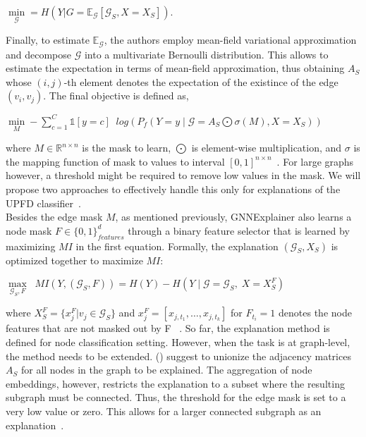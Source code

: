 \begin{center}
    $\min\limits_{\mathcal{G}} = H(Y | G = \mathbb{E}_{\mathcal{G}} [\mathcal{G}_S, X = X_S])$.
\end{center}
Finally, to estimate $\mathbb{E}_{\mathcal{G}}$, the authors employ mean-field variational approximation and decompose $\mathcal{G}$ into a multivariate Bernoulli distribution. This allows to estimate the expectation in terms of mean-field approximation, thus obtaining $A_S$ whose $(i, j)$-th element denotes the expectation of the existince of the edge $(v_i, v_j)$. The final objective is defined as,
\begin{center}
    $\min\limits_M - \sum\limits_{c=1}^C \mathbb{1}[y = c] \;\;log(P_f (Y=y \;|\; \mathcal{G} = A_S \bigodot \sigma(M), X = X_S))$
\end{center}
where $M \in \mathbb{R}^{n \times n}$ is the mask to learn, $\bigodot$ is element-wise multiplication, and $\sigma$ is
the mapping function of mask to values to interval $[0, 1]^{n \times n}$~\parencite{GNNExplainer_Ying}. For large graphs however, a threshold might be required to remove low values in the mask. We will propose two approaches to effectively
handle this only for explanations of the UPFD classifier~\parencite{GNNExplainer_Ying}.\\
Besides the edge mask $M$, as mentioned previously, GNNExplainer also learns a node mask $F \in \{0, 1\}^d_{features}$ through a binary feature selector that is learned by maximizing $MI$ in the first equation. Formally, the explanation $(\mathcal{G}_S, X_S)$ is optimized together to maximize $MI$:
\begin{center}
    $\max\limits_{\mathcal{G}_S, F} \;\; MI (Y, (\mathcal{G}_S, F)) = H(Y) - H(Y \;|\; \mathcal{G} = \mathcal{G}_S,\; X = X_S^F)$
\end{center}
where $X_S^F = \{x_j^F|v_j \in \mathcal{G}_S\}$ and $x_j^F = [x_{j, t_1}, \dots, x_{j, t_k}]$ for
$F_{t_i} = 1$ denotes the node features that are not masked out by F~\parencite{GNNExplainer_Ying} . So far, the
explanation method is defined for node classification setting. However, when the task is at graph-level, the method needs
to be extended. \citeauthor{GNNExplainer_Ying} (\citeyear{GNNExplainer_Ying}) suggest to unionize the adjacency matrices $A_S$ for all nodes in the graph to be explained. The aggregation of node embeddings, however, restricts the explanation to a subset where the resulting subgraph must be connected. Thus, the threshold for the edge mask is set to a very low value or zero. This allows for a larger connected subgraph as an explanation~\parencite{GNNExplainer_Ying}.\\


